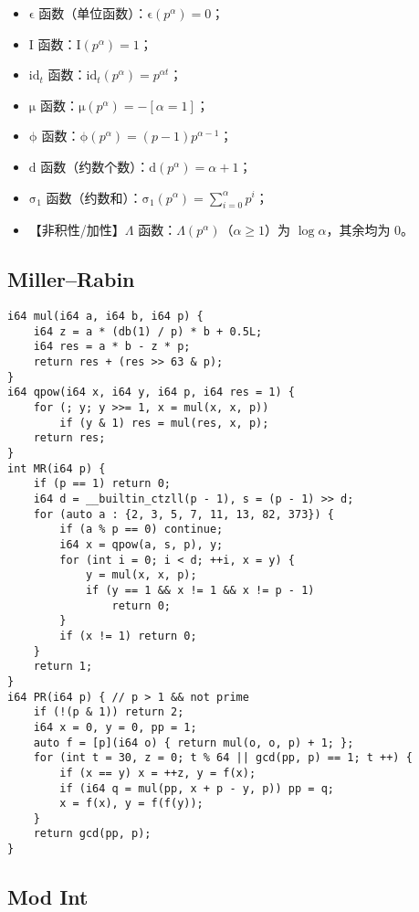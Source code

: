 \documentclass[a4paper,landscape,twocolumn]{ctexart}
\begin{document}
\begin{itemize}
\item $\mathrm{\epsilon}$ 函数（单位函数）：$\mathrm{\epsilon} (p ^ \alpha) = 0$；
\item $\mathrm{I}$ 函数：$\mathrm{I} (p ^ \alpha) = 1$；
\item $\mathrm{id}_t$ 函数：$\mathrm{id}_t (p ^ \alpha) = p ^ {\alpha t}$；
\item $\mathrm{\mu}$ 函数：$\mathrm{\mu} (p ^ \alpha) = - \left [ \alpha = 1 \right ]$；
\item $\mathrm{\phi}$ 函数：$\mathrm{\phi} (p ^ \alpha) = (p - 1) p ^ {\alpha - 1}$；
\item $\mathrm{d}$ 函数（约数个数）：$\mathrm{d} (p ^ \alpha) = \alpha + 1$；
\item $\mathrm{\sigma}_1$ 函数（约数和）：$\mathrm{\sigma}_1 (p ^ \alpha) = \sum_{i = 0}^{\alpha} p ^ i$；
\item 【非积性/加性】$\Lambda$ 函数：$\Lambda (p ^ \alpha)$（$\alpha \geq 1$）为 $\log \alpha$，其余均为 $0$。
\end{itemize}

\subsection{Miller–Rabin}

\begin{lstlisting}
i64 mul(i64 a, i64 b, i64 p) {
	i64 z = a * (db(1) / p) * b + 0.5L;
	i64 res = a * b - z * p;
	return res + (res >> 63 & p);
}
i64 qpow(i64 x, i64 y, i64 p, i64 res = 1) {
	for (; y; y >>= 1, x = mul(x, x, p))
		if (y & 1) res = mul(res, x, p);
	return res;
}
int MR(i64 p) {
	if (p == 1) return 0;
	i64 d = __builtin_ctzll(p - 1), s = (p - 1) >> d;
	for (auto a : {2, 3, 5, 7, 11, 13, 82, 373}) {
		if (a % p == 0) continue;
		i64 x = qpow(a, s, p), y;
		for (int i = 0; i < d; ++i, x = y) {
			y = mul(x, x, p);
			if (y == 1 && x != 1 && x != p - 1)
				return 0;
		}
		if (x != 1) return 0;
	}
	return 1;
}
i64 PR(i64 p) { // p > 1 && not prime
	if (!(p & 1)) return 2;
	i64 x = 0, y = 0, pp = 1;
	auto f = [p](i64 o) { return mul(o, o, p) + 1; };
	for (int t = 30, z = 0; t % 64 || gcd(pp, p) == 1; t ++) {
		if (x == y) x = ++z, y = f(x);
		if (i64 q = mul(pp, x + p - y, p)) pp = q;
		x = f(x), y = f(f(y));
	}
	return gcd(pp, p);
}
\end{lstlisting}

\subsection{Mod Int}
\end{document}
